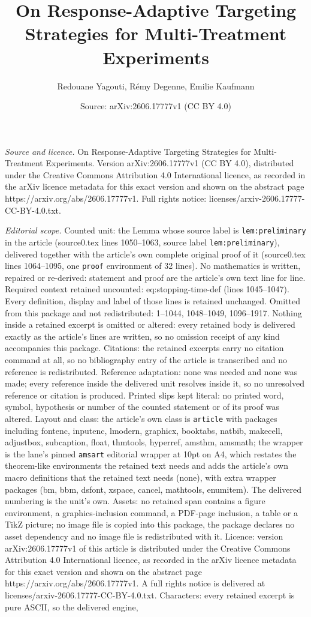 \documentclass[10pt,a4paper]{amsart}
\title[On Response-Adaptive Targeting Strategies for Multi-Treatmen]{On Response-Adaptive Targeting Strategies for Multi-Treatment Experiments}
\author{Redouane Yagouti, R\'emy Degenne, Emilie Kaufmann}
\date{Source: arXiv:2606.17777v1 (CC BY 4.0)}
\begin{document}
\maketitle

\noindent\emph{Source and licence.} On Response-Adaptive Targeting Strategies for Multi-Treatment Experiments. Version arXiv:2606.17777v1 (CC BY 4.0), distributed under the Creative Commons Attribution 4.0 International licence, as recorded in the arXiv licence metadata for this exact version and shown on the abstract page https://arxiv.org/abs/2606.17777v1. Full rights notice: licenses/arxiv-2606.17777-CC-BY-4.0.txt.\par\smallskip

\noindent\textit{Editorial scope.} Counted unit: the Lemma whose source label is \texttt{lem:preliminary} in the article (source0.tex lines 1050--1063, source label \texttt{lem:preliminary}), delivered together with the article's own complete original proof of it (source0.tex lines 1064--1095, one \texttt{proof} environment of 32 lines). No mathematics is written, repaired or re-derived: statement and proof are the article's own text line for line. Required context retained uncounted: eq:stopping-time-def (lines 1045--1047). Every definition, display and label of those lines is retained unchanged. Omitted from this package and not redistributed: 1--1044, 1048--1049, 1096--1917. Nothing inside a retained excerpt is omitted or altered: every retained body is delivered exactly as the article's lines are written, so no omission receipt of any kind accompanies this package. Citations: the retained excerpts carry no citation command at all, so no bibliography entry of the article is transcribed and no reference is redistributed. Reference adaptation: none was needed and none was made; every reference inside the delivered unit resolves inside it, so no unresolved reference or citation is produced. Printed slips kept literal: no printed word, symbol, hypothesis or number of the counted statement or of its proof was altered. Layout and class: the article's own class is \texttt{article} with packages including fontenc, inputenc, lmodern, graphicx, booktabs, natbib, makecell, adjustbox, subcaption, float, thmtools, hyperref, amsthm, amsmath; the wrapper is the lane's pinned \texttt{amsart} editorial wrapper at 10pt on A4, which restates the theorem-like environments the retained text needs and adds the article's own macro definitions that the retained text needs (none), with extra wrapper packages (bm, bbm, dsfont, xspace, cancel, mathtools, enumitem). The delivered numbering is the unit's own. Assets: no retained span contains a figure environment, a graphics-inclusion command, a PDF-page inclusion, a table or a TikZ picture; no image file is copied into this package, the package declares no asset dependency and no image file is redistributed with it. Licence: version arXiv:2606.17777v1 of this article is distributed under the Creative Commons Attribution 4.0 International licence, as recorded in the arXiv licence metadata for this exact version and shown on the abstract page https://arxiv.org/abs/2606.17777v1. A full rights notice is delivered at licenses/arxiv-2606.17777-CC-BY-4.0.txt. Characters: every retained excerpt is pure ASCII, so the delivered engine, 
\end{document}
